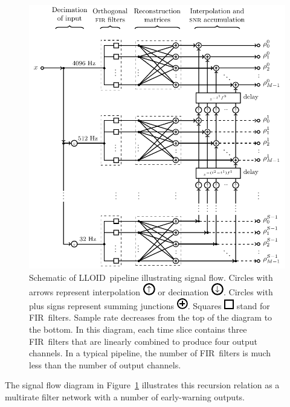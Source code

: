 \documentclass[preprint2]{aastex}
\newcommand{\fir}{FIR}%
\newcommand{\lloid}{LLOID}%
\begin{document}
\begin{figure}[h!]
	\begin{center}
		\includegraphics{figures/lloid-diagram}
		\caption{\label{fig:pipeline} Schematic of \lloid\ pipeline illustrating
signal flow.  Circles with arrows represent interpolation
\protect\includegraphics{figures/upsample-symbol} or decimation
\protect\includegraphics{figures/downsample-symbol}.  Circles with plus
signs represent summing junctions
\protect\includegraphics{figures/adder-symbol}.  Squares
\protect\includegraphics{figures/fir-symbol} stand for \fir\ filters.  Sample
rate decreases from the top of the diagram to the bottom.  In this diagram, each
time slice contains three \fir\ filters that are linearly combined to produce
four output channels.  In a typical pipeline, the number of \fir\ filters is
much less than the number of output channels.}
	\end{center}
\end{figure}
%
%
The signal flow diagram in Figure~\ref{fig:pipeline} illustrates this
recursion relation as a multirate filter network with a number of early-warning outputs.
\end{document}
